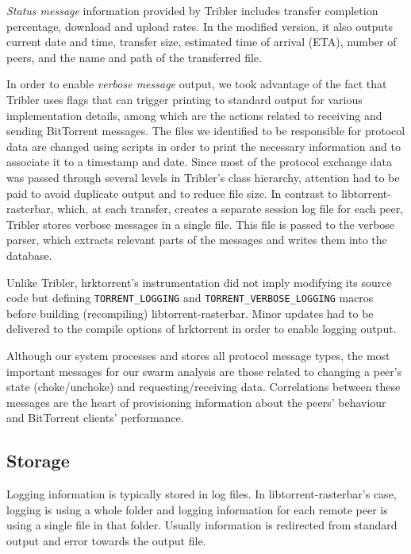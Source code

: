 \textit{Status message} information provided by Tribler includes transfer
completion percentage, download and upload rates. In the modified version, it
also outputs current date and time, transfer size, estimated time of arrival
(ETA), number of peers, and the name and path of the transferred file.

In order to enable \textit{verbose message} output, we took advantage of the
fact that Tribler uses flags that can trigger printing to standard output for
various implementation details, among which are the actions related to
receiving and sending BitTorrent messages. The files we identified to be
responsible for protocol data are changed using scripts in order to print the
necessary information and to associate it to a timestamp and date. Since most
of the protocol exchange data was passed through several levels in Tribler's
class hierarchy, attention had to be paid to avoid duplicate output and to
reduce file size. In contrast to libtorrent-rasterbar, which, at each transfer,
creates a separate session log file for each peer, Tribler stores verbose
messages in a single file. This file is passed to the verbose parser, which
extracts relevant parts of the messages and writes them into the database.

Unlike Tribler, hrktorrent's instrumentation did not imply modifying its
source code but defining \texttt{TORRENT\_LOGGING} and
\texttt{TORRENT\_VERBOSE\_LOGGING} macros before building (recompiling)
libtorrent-rasterbar. Minor updates had to be delivered to the compile options
of hrktorrent in order to enable logging output.

Although our system processes and stores all protocol message types,
the most important messages for our swarm analysis are those related to
changing a peer's state (choke/unchoke) and requesting/receiving data.
Correlations between these messages are the heart of provisioning information
about the peers' behaviour and BitTorrent clients' performance.

\subsection{Storage}

Logging information is typically stored in log files. In
libtorrent-rasterbar's case, logging is using a whole folder and logging
information for each remote peer is using a single file in that folder.
Usually information is redirected from standard output and error towards the
output file.

